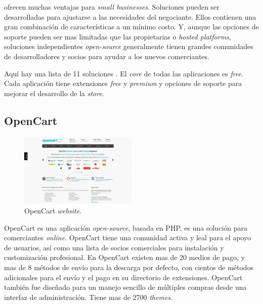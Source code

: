 

\opensource \ecommerce \shoppingcarts ofrecen muchas ventajas para \textit{small businesses}. Soluciones \opensource pueden ser desarrolladas para ajustarse a las necesidades del negociante. Ellos contienen una gran combinación de características a un mínimo costo. Y, aunque las opciones de soporte pueden ser mas limitadas que las propietarias o \textit{hosted platforms}, soluciones independientes \textit{open-source} generalmente tienen grandes comunidades de desarrolladores y socios para ayudar a los nuevos comerciantes.

Aquí hay una lista de 11 soluciones \ecommerce \opensource. El \textit{core} de todas las aplicaciones es \textit{free}. Cada aplicación tiene extensiones \textit{free} y \textit{premium} y opciones de soporte para mejorar el desarrollo de la \textit{store}.

\newcommand{\nameOpenCart}{OpenCart }
\subsection{\nameOpenCart}

\begin{figure}[h!]
	\centering
	\includegraphics[width=0.5\textwidth]{figuras/cap1/openCartWebsite.jpg}
	\caption{\nameOpenCart \textit{website}\cite{online_OpenCartWebsite}.}
\end{figure}

\nameOpenCart es una aplicación \textit{open-source}, basada en PHP, es una solución \ecommerce para comerciantes \textit{online}. \nameOpenCart tiene una comunidad activa y leal para el apoyo de usuarios, así como una lista de socios comerciales para instalación y customización profesional. En \nameOpenCart existen mas de 20 medios de pago, y mas de 8 métodos de envío para la descarga por defecto, con cientos de métodos adicionales para el envío y el pago en su directorio de extensiones. \nameOpenCart también fue diseñado para un manejo sencillo de múltiples compras desde una interfaz de administración. Tiene mas de 2700 \textit{themes}.

